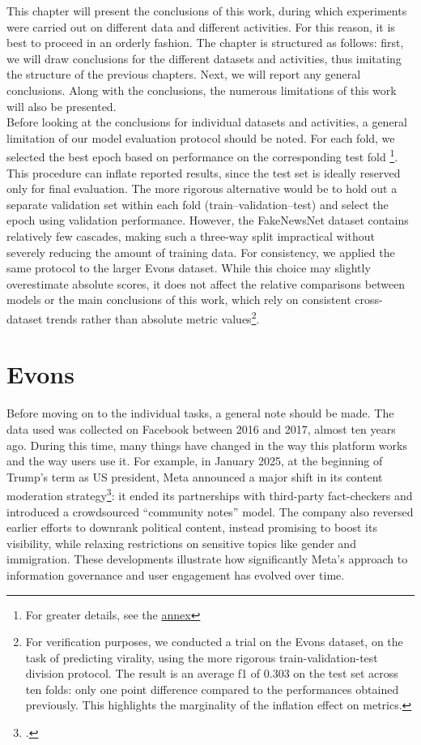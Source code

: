 \documentclass[a4paper,twoside,12pt]{book}
\begin{document}
This chapter will present the conclusions of this work, during which experiments were carried out on different data and different activities. For this reason, it is best to proceed in an orderly fashion. The chapter is structured as follows: first, we will draw conclusions for the different datasets and activities, thus imitating the structure of the previous chapters. Next, we will report any general conclusions. Along with the conclusions, the numerous limitations of this work will also be presented. \\
Before looking at the conclusions for individual datasets and activities, a general limitation of our model evaluation protocol should be noted. For each fold, we selected the best epoch based on performance on the corresponding test fold \footnote{For greater details, see the \hyperref[annex]{annex}}. This procedure can inflate reported results, since the test set is ideally reserved only for final evaluation. The more rigorous alternative would be to hold out a separate validation set within each fold (train–validation–test) and select the epoch using validation performance. However, the FakeNewsNet dataset contains relatively few cascades, making such a three-way split impractical without severely reducing the amount of training data. For consistency, we applied the same protocol to the larger Evons dataset. While this choice may slightly overestimate absolute scores, it does not affect the relative comparisons between models or the main conclusions of this work, which rely on consistent cross-dataset trends rather than absolute metric values\footnote{For verification purposes, we conducted a trial on the Evons dataset, on the task of predicting virality, using the more rigorous train-validation-test division protocol. The result is an average f1 of 0.303 on the test set across ten folds: only one point difference compared to the performances obtained previously. This highlights the marginality of the inflation effect on metrics.}.

\section{Evons}
Before moving on to the individual tasks, a general note should be made. The data used was collected on Facebook between 2016 and 2017, almost ten years ago. During this time, many things have changed in the way this platform works and the way users use it. For example, in January 2025, at the beginning of Trump's term as US president, Meta announced a major shift in its content moderation strategy\footcite{paul2025}: it ended its partnerships with third-party fact-checkers and introduced a crowdsourced “community notes” model. The company also reversed earlier efforts to downrank political content, instead promising to boost its visibility, while relaxing restrictions on sensitive topics like gender and immigration. These developments illustrate how significantly Meta’s approach to information governance and user engagement has evolved over time. 
\end{document}
